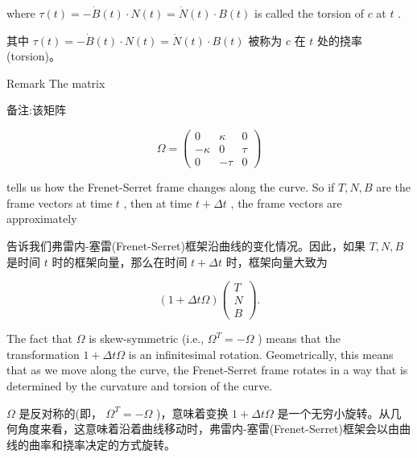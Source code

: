 where \(\tau \left( t\right)  =  - \dot{B}\left( t\right)  \cdot  N\left( t\right)  = \dot{N}\left( t\right)  \cdot  B\left( t\right)\) is called the torsion of \(c\) at \(t\) .

\begin{tcolorbox}
其中 \(\tau \left( t\right)  =  - \dot{B}\left( t\right)  \cdot  N\left( t\right)  = \dot{N}\left( t\right)  \cdot  B\left( t\right)\) 被称为 \(c\) 在 \(t\) 处的挠率(torsion)。
\end{tcolorbox}

Remark The matrix

\begin{tcolorbox}
备注:该矩阵
\end{tcolorbox}

\[
\Omega  = \left( \begin{matrix} 0 & \kappa & 0 \\   - \kappa & 0 & \tau \\  0 &  - \tau & 0 \end{matrix}\right)  \tag{4.2}
\]

tells us how the Frenet-Serret frame changes along the curve. So if \(T,N,B\) are the frame vectors at time \(t\) , then at time \(t + {\Delta t}\) , the frame vectors are approximately

\begin{tcolorbox}
告诉我们弗雷内-塞雷(Frenet-Serret)框架沿曲线的变化情况。因此，如果 \(T,N,B\) 是时间 \(t\) 时的框架向量，那么在时间 \(t + {\Delta t}\) 时，框架向量大致为
\end{tcolorbox}

\[
\left( {1 + {\Delta t\Omega }}\right) \left( \begin{array}{l} T \\  N \\  B \end{array}\right) . \tag{4.3}
\]

The fact that \(\Omega\) is skew-symmetric (i.e., \({\Omega }^{T} =  - \Omega\) ) means that the transformation \(1 + {\Delta t\Omega }\) is an infinitesimal rotation. Geometrically, this means that as we move along the curve, the Frenet-Serret frame rotates in a way that is determined by the curvature and torsion of the curve.

\begin{tcolorbox}
\(\Omega\) 是反对称的(即， \({\Omega }^{T} =  - \Omega\) )，意味着变换 \(1 + {\Delta t\Omega }\) 是一个无穷小旋转。从几何角度来看，这意味着沿着曲线移动时，弗雷内-塞雷(Frenet-Serret)框架会以由曲线的曲率和挠率决定的方式旋转。
\end{tcolorbox}